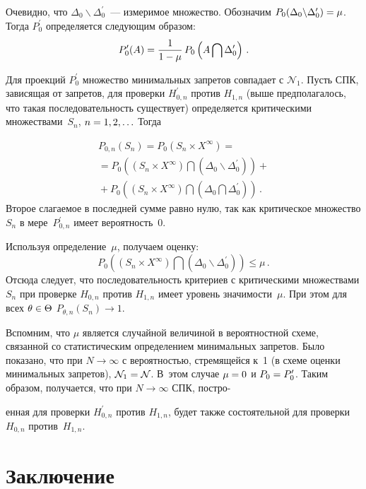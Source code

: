 \begin{multicols}{2}
  Очевидно, что $\Delta_0\backslash \Delta^\prime_0$~--- измеримое множество. 
Обозначим $P_0(\Delta_0\backslash \Delta^\prime_0)\hm=\mu$. Тогда 
$P_0^\prime$ определяется следующим образом: 
  $$
  P_0^\prime(A) =\displaystyle\frac{\displaystyle 1\mathstrut}{\displaystyle 1-\mu\mathstrut}\,P_0\left( A\bigcap \Delta^\prime_0\right)\,.
  $$
  
  Для проекций $P^\prime_0$ множество минимальных запретов совпадает с $\mathcal{N}_1$.
  Пусть СПК, зависящая от запретов, для проверки $H^\prime_{0,n}$ против 
$H_{1,n}$ (выше предполагалось, что такая последовательность существует) 
определяется критическими множествами~$S_n$, $n\hm=1,2,\ldots$ Тогда 

\noindent 
  \begin{multline*}
  P_{0,n}(S_n) =P_0 \left(S_n\times X^\infty\right)={}\\
  {}= P_0\left( \left( S_n\times X^\infty\right)\bigcap \left( \Delta_0\backslash 
\Delta^\prime_0\right)\right) +{}\\
{}+P_0\left(\left( S_n\times X^\infty\right) \bigcap 
\left( \Delta_0\bigcap\Delta_0^\prime\right)\right)\,.
  \end{multline*}
Второе слагаемое в последней сумме равно нулю, так как критическое 
множество $S_n$ в мере~$P^\prime_{0,n}$ имеет вероятность~0. 
  
  Используя определение~$\mu$, получаем оценку:
  $$
  P_0\left(\left( S_n\times X^\infty\right) \bigcap \left( \Delta_0\backslash 
\Delta^\prime_0 \right)\right) \leq \mu\,.
  $$
    Отсюда следует, что последовательность критериев с критическими 
множествами $S_n$ при проверке $H_{0,n}$ против $H_{1,n}$ имеет уровень 
значимости~$\mu$. При этом для всех $\theta\hm\in \Theta$ 
$P_{\theta,n}(S_n)\rightarrow 1$. 
  
  Вспомним, что $\mu$ является случайной величиной в вероятностной схеме, 
связанной со статистическим определением минимальных запретов. Было 
показано, что при $N\rightarrow\infty$ с вероятностью, стремящейся к~1 (в 
схеме оценки минимальных запретов), $\mathcal{N}_1\hm=\mathcal{N}$. 
В~этом случае $\mu\hm=0$ и $P_0\hm=P_0^\prime$. Таким образом, 
получается, что при $N\rightarrow \infty$ СПК, постро-\linebreak\vspace*{-12pt}

\pagebreak

\noindent
енная для проверки 
$H^\prime_{0,n}$ против $H_{1,n}$, будет также состоятельной для проверки 
$H_{0,n}$ против~$H_{1,n}$.
  
\section{Заключение}


\end{multicols}
